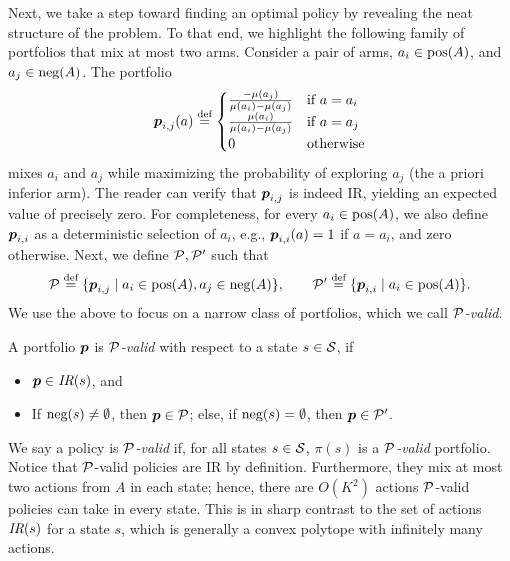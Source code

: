 Next, we take a step toward finding an optimal policy by revealing the neat structure of the problem. To that end, we highlight the following family of portfolios that mix at most two arms. Consider a pair of arms, $a_i\in \textnormal{pos}(A)$, and $a_j\in \textnormal{neg}(A)$. The portfolio
\begin{align}\label{eq:blp from body}
\boldsymbol{ p }_{i,j}(a) \stackrel{\text{def}}{=} 
\begin{cases}
\frac{-\mu(a_j)}{\mu(a_i)-\mu(a_j)} & \textnormal{if } a=a_i\\
\frac{\mu(a_i)}{\mu(a_i)-\mu(a_j)} & \textnormal{if } a=a_j\\
0 & \textnormal{otherwise}
\end{cases}
\end{align}
mixes $a_i$ and $a_j$ while maximizing the probability of exploring $a_j$ (the a priori inferior arm). The reader can verify that $\boldsymbol{ p }_{i,j}$ is indeed IR, yielding an expected value of precisely zero. For completeness, for every $a_i \in \textnormal{pos}(A)$, we also define $\boldsymbol{ p }_{i,i}$ as a deterministic selection of $a_i$, e.g., $\boldsymbol{ p }_{i,i}(a)=1$ if $a=a_i$, and zero otherwise. Next, we define $\mathcal{P},\mathcal{P}'$ such that
\[
\mathcal{P}\stackrel{\text{def}}{=} \{\boldsymbol{ p }_{i,j}\mid a_i\in \textnormal{pos}(A), a_j\in \textnormal{neg}(A) \}, \qquad \mathcal{P}'\stackrel{\text{def}}{=}\{\boldsymbol{ p }_{i,i}\mid a_i\in \textnormal{pos}(A) \}.
\]
We use the above to focus on a narrow class of portfolios, which we call \emph{$\mathcal{P}$-valid}.
\begin{definition}\label{def:p valid}
A portfolio $\boldsymbol{ p }$ is \emph{$\mathcal{P}$-valid} with respect to a state $s\in \mathcal{S}$, if
\begin{itemize}
\item $\boldsymbol{ p } \in \textit{IR}(s)$, and
\item If $\textnormal{neg}(s)\neq \emptyset$, then $\boldsymbol{ p }\in \mathcal{P}$; else, if $\textnormal{neg}(s)= \emptyset$, then $\boldsymbol{ p }\in \mathcal{P}'$.
\end{itemize} 
\end{definition}
We say a policy is \emph{$\mathcal{P}$-valid} if, for all states $s\in \mathcal{S}$, $\pi(s)$ is a \emph{$\mathcal{P}$-valid} portfolio. Notice that $\mathcal{P}$-valid policies are IR by definition. Furthermore, they mix at most two actions from $A$ in each state; hence, there are  $O(K^2)$ actions $\mathcal{P}$-valid policies can take in every state. This is in sharp contrast to the set of actions $\textit{IR}(s)$ for a state $s$, which is generally a convex polytope with infinitely many actions. 

